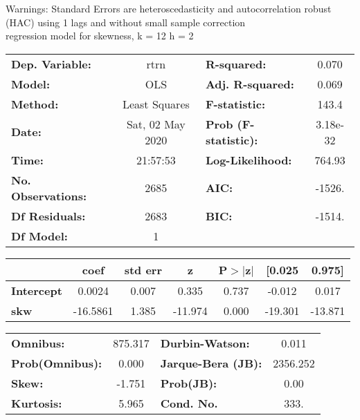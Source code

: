 Warnings: \newline
 [1] Standard Errors are heteroscedasticity and autocorrelation robust (HAC) using 1 lags and without small sample correction\\ 

regression model for skewness, k = 12 h = 2\begin{center}
\begin{tabular}{lclc}
\toprule
\textbf{Dep. Variable:}    &       rtrn       & \textbf{  R-squared:         } &     0.070   \\
\textbf{Model:}            &       OLS        & \textbf{  Adj. R-squared:    } &     0.069   \\
\textbf{Method:}           &  Least Squares   & \textbf{  F-statistic:       } &     143.4   \\
\textbf{Date:}             & Sat, 02 May 2020 & \textbf{  Prob (F-statistic):} &  3.18e-32   \\
\textbf{Time:}             &     21:57:53     & \textbf{  Log-Likelihood:    } &    764.93   \\
\textbf{No. Observations:} &        2685      & \textbf{  AIC:               } &    -1526.   \\
\textbf{Df Residuals:}     &        2683      & \textbf{  BIC:               } &    -1514.   \\
\textbf{Df Model:}         &           1      & \textbf{                     } &             \\
\bottomrule
\end{tabular}
\begin{tabular}{lcccccc}
                   & \textbf{coef} & \textbf{std err} & \textbf{z} & \textbf{P$> |$z$|$} & \textbf{[0.025} & \textbf{0.975]}  \\
\midrule
\textbf{Intercept} &       0.0024  &        0.007     &     0.335  &         0.737        &       -0.012    &        0.017     \\
\textbf{skw}       &     -16.5861  &        1.385     &   -11.974  &         0.000        &      -19.301    &      -13.871     \\
\bottomrule
\end{tabular}
\begin{tabular}{lclc}
\textbf{Omnibus:}       & 875.317 & \textbf{  Durbin-Watson:     } &    0.011  \\
\textbf{Prob(Omnibus):} &   0.000 & \textbf{  Jarque-Bera (JB):  } & 2356.252  \\
\textbf{Skew:}          &  -1.751 & \textbf{  Prob(JB):          } &     0.00  \\
\textbf{Kurtosis:}      &   5.965 & \textbf{  Cond. No.          } &     333.  \\
\bottomrule
\end{tabular}
\end{center}

